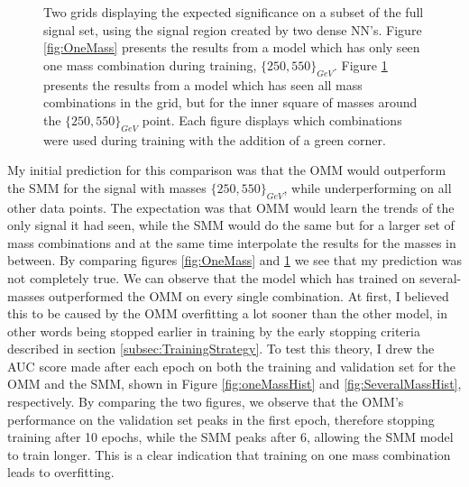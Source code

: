 \begin{figure}
{\begin{subfigure}{.6\textwidth}
        \vspace{-1.cm}
        \caption{}
        \label{fig:SeveralMass}
    \end{subfigure}
    }
    \caption[Two grids displaying the expected significance on a subset of the full signal set, using the signal region 
    created by two dense \acs{NN}'s, each training on different amounts of signal.]{Two grids displaying the expected significance 
    on a subset of the full signal set, using the signal region created by two dense \ac{NN}'s. Figure \ref{fig:OneMass} presents the results 
    from a model which has only seen one mass combination during training, $\{250,550\}_{GeV}$. Figure 
    \ref{fig:SeveralMass} presents the results from a model which has seen all mass combinations in the grid, but for the inner square of masses
    around the $\{250,550\}_{GeV}$ point. Each figure displays which combinations were used during training with the addition of a green corner.}
    \label{fig:Interpolation}
\end{figure}
My initial prediction for this comparison was that the \ac{OMM} would outperform the \ac{SMM} for the signal with masses
$\{250,550\}_{GeV}$, while underperforming on all other data points. The expectation was that \ac{OMM} 
would learn the trends of the only signal it had seen, while the \ac{SMM} would do the same but for a larger set of mass combinations and 
at the same time interpolate the results for the masses in between. By comparing figures \ref{fig:OneMass} and \ref{fig:SeveralMass} we 
see that my prediction was not completely true. We can observe that the model which has trained on several-masses outperformed the 
\ac{OMM} on every single combination. At first, I believed this to be caused by the \ac{OMM} overfitting a lot sooner than the other 
model, in other words being stopped earlier in training by the early stopping criteria described in section \ref{subsec:TrainingStrategy}. 
To test this theory, I drew the \ac{AUC} score made after each epoch on both the training and validation set for the \ac{OMM} and the 
\ac{SMM}, shown in Figure \ref{fig:oneMassHist} and \ref{fig:SeveralMassHist}, respectively. By comparing the two figures,
we observe that the \ac{OMM}'s performance on the validation set peaks in the first epoch, therefore stopping training after 
10 epochs, while the \ac{SMM} peaks after 6, allowing the \ac{SMM} model to train longer. This is a clear indication that training on 
one mass combination leads to overfitting. 
